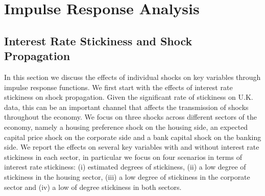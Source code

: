 \documentclass[12pt]{article}
\numberwithin{equation}{section}
\begin{document}

\FloatBarrier


\section{Impulse Response Analysis}

\subsection{Interest Rate Stickiness and Shock Propagation}

In this section we discuss the effects of individual shocks on key variables through impulse response functions. We first start with the effects of interest rate stickiness on shock propagation. Given the significant rate of stickiness on U.K. data, this can be an important channel that affects the transmission of shocks throughout the economy. We focus on three shocks across different sectors of the economy, namely a housing preference shock on the housing side, an expected capital price shock on the corporate side and a bank capital shock on the banking side. We report the effects on several key variables with and without interest rate stickiness in each sector, in particular we focus on four scenarios in terms of interest rate stickiness: (i) estimated degrees of stickiness, (ii) a low degree of stickiness in the housing sector, (iii) a low degree of stickiness in the corporate sector and (iv) a low of degree stickiness in both sectors. 
\end{document}
